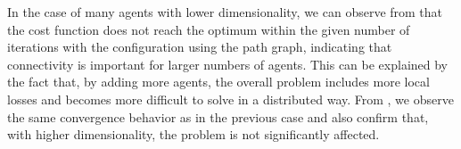 \documentclass[a4paper,11pt,oneside]{book}
\begin{document}
In the case of many agents with lower dimensionality, we can observe from  that the cost function does not reach the optimum within the given number of iterations with the configuration using the path graph, indicating that connectivity is important for larger numbers of agents. This can be explained by the fact that, by adding more agents, the overall problem includes more local losses and becomes more difficult to solve in a distributed way. From , we observe the same convergence behavior as in the previous case and also confirm that, with higher dimensionality, the problem is not significantly affected.



\end{document}

